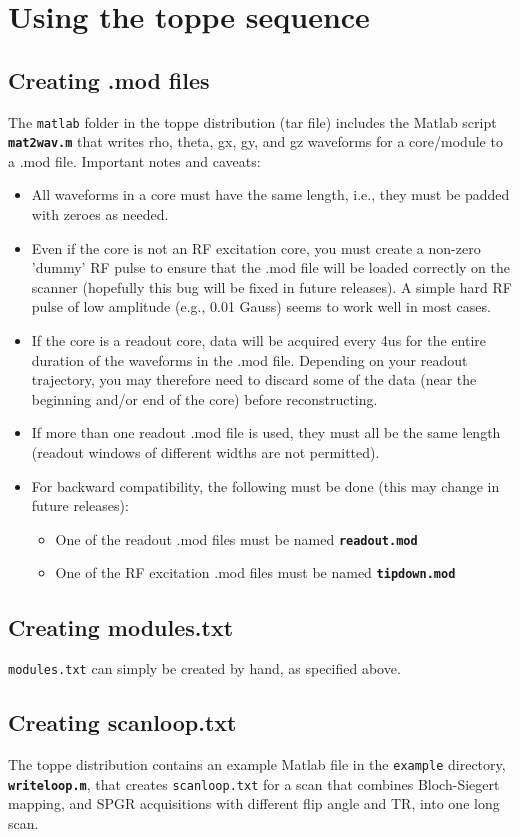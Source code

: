 
\chapter{Using the toppe sequence}

\section{Creating .mod files}
The {\tt matlab} folder in the toppe distribution (tar file) includes the Matlab script {\tt \bf mat2wav.m} that writes rho, theta, gx, gy, and gz waveforms for a core/module to a .mod file.
Important notes and caveats:
\begin{itemize}
\item All waveforms in a core must have the same length, i.e., they must be padded with zeroes as needed.
\item Even if the core is not an RF excitation core, you must create a non-zero 'dummy' RF pulse to ensure that the .mod file will be loaded correctly on the scanner (hopefully this bug will be fixed in future releases). A simple hard RF pulse of low amplitude (e.g., 0.01 Gauss) seems to work well in most cases.
\item If the core is a readout core, data will be acquired every 4us for the entire duration of the waveforms in the .mod file. Depending on your readout trajectory, you may therefore need to discard some of the data (near the beginning and/or end of the core) before reconstructing.
\item If more than one readout .mod file is used, they must all be the same length (readout windows of different widths are not permitted).
\item For backward compatibility, the following must be done (this may change in future releases):
\begin{itemize}
	\item One of the readout .mod files must be named {\tt \bf readout.mod} 
	\item One of the RF excitation .mod files must be named {\tt \bf tipdown.mod} 
\end{itemize}
\end{itemize}


\section{Creating modules.txt}
{\tt modules.txt} can simply be created by hand, as specified above.


\section{Creating scanloop.txt}
The toppe distribution contains an example Matlab file in the \texttt{example} directory, {\tt \bf writeloop.m}, that creates {\tt scanloop.txt} for a scan that combines Bloch-Siegert mapping, and SPGR acquisitions with different flip angle and TR, into one long scan. 

